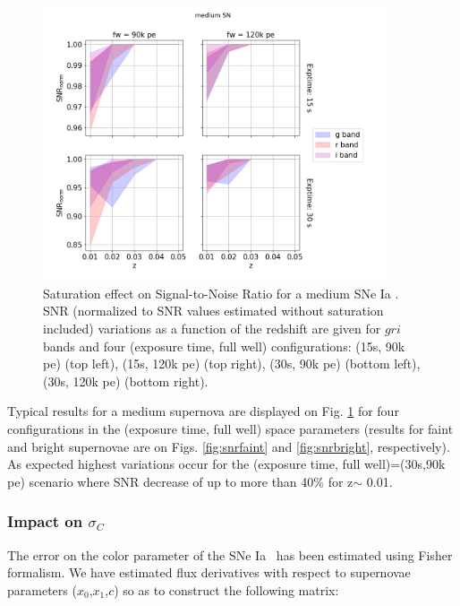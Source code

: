 \documentclass[\docopts]{\docclass}
\newcommand{\sne}{{SNe Ia }}
\newcommand{\pe}{{pe}}
\newcommand{\snstretch}{{$x_{1}$}}
\newcommand{\sncolor}{{$c$}}
\newcommand{\snx}{{$x_0$}}
\newcommand{\colorerr}{{$\sigma_C$}}
\begin{document}
\begin{figure}[htbp]
\begin{center}
  \includegraphics[width=0.9\textwidth]{SNR_medium.png}
 \caption{Saturation effect on Signal-to-Noise Ratio for a medium \sne. SNR (normalized to SNR values estimated without saturation included) variations as a function of the redshift are given for $gri$ bands and four (exposure time, full well) configurations: (15s, 90k \pe) (top left),  (15s, 120k \pe) (top right), (30s, 90k \pe) (bottom left),  (30s, 120k \pe) (bottom right).}\label{fig:snrmedium}
\end{center}
\end{figure}

Typical results for a medium supernova are displayed on Fig. \ref{fig:snrmedium} for four configurations in the (exposure time, full well) space parameters (results for faint and bright supernovae are on Figs. \ref{fig:snrfaint} and  \ref{fig:snrbright}, respectively). As expected highest variations occur for the (exposure time, full well)=(30s,90k \pe) scenario where SNR decrease of up to more than 40\% for z$\sim$ 0.01. 

\subsubsection{Impact on \colorerr}

The error on the color parameter of the \sne~has been estimated using Fisher formalism. We have estimated flux derivatives with respect to supernovae parameters (\snx,\snstretch,\sncolor) so as to construct the following matrix:
\end{document}
